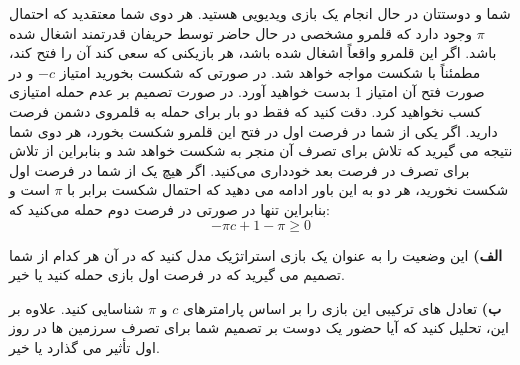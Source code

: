 شما و دوستتان در حال انجام یک بازی ویدیویی هستید. هر دوی شما معتقدید که احتمال
$\pi$
وجود دارد که قلمرو مشخصی در حال حاضر توسط حریفان قدرتمند اشغال شده باشد. اگر این قلمرو واقعاً اشغال شده باشد، هر بازیکنی که سعی کند آن را فتح کند، مطمئناً با شکست مواجه خواهد شد. در صورتی که شکست بخورید امتیاز
$-c$
و در صورت فتح آن امتیاز 1 بدست خواهید آورد. در صورت تصمیم بر عدم حمله امتیازی کسب نخواهید کرد. دقت کنید که فقط دو بار برای حمله به قلمروی دشمن فرصت دارید. اگر یکی از شما در فرصت اول در فتح این قلمرو شکست بخورد، هر دوی شما نتیجه می گیرید که تلاش برای تصرف آن منجر به شکست خواهد شد و بنابراین از تلاش برای تصرف در فرصت بعد خودداری می‌کنید. اگر هیچ یک از شما در فرصت اول شکست نخورید، هر دو به این باور ادامه می دهید که احتمال شکست برابر با
$\pi$
است و بنابراین تنها در صورتی در فرصت دوم حمله می‌کنید که:
\[
-\pi c + 1 - \pi \geq 0  
\]

\textbf{الف)}
این وضعیت را به عنوان یک بازی استراتژیک مدل کنید که در آن هر کدام از شما تصمیم می گیرید که در فرصت اول بازی حمله کنید یا خیر.
\vspace{5pt}

\textbf{ب)}
تعادل های ترکیبی این بازی را بر اساس پارامترهای
$c$
و
$\pi$
شناسایی کنید. علاوه بر این، تحلیل کنید که آیا حضور یک دوست بر تصمیم شما برای تصرف سرزمین ها در روز اول تأثیر می گذارد یا خیر.